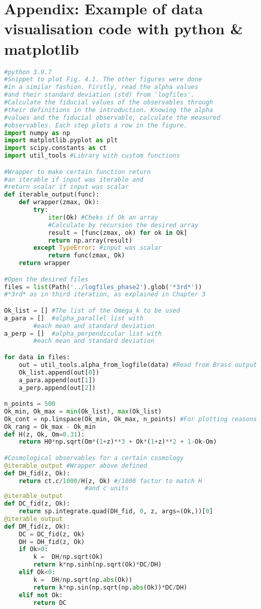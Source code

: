 \chapter*{Appendix: Example of data visualisation code with python \& matplotlib}

\renewcommand{\baselinestretch}{1}
\begin{lstlisting}[language=python]
#python 3.9.7
#Snippet to plot Fig. 4.1. The other figures were done
#in a similar fashion. Firstly, read the alpha values
#and their standard deviation (std) from 'logfiles'.
#Calculate the fiducial values of the observables through
#their definitions in the introduction. Knowing the alpha
#values and the fiducial observable, calculate the measured
#observables. Each step plots a row in the figure.
import numpy as np
import matplotlib.pyplot as plt
import scipy.constants as ct
import util_tools #Library with custom functions

#Wrapper to make certain function return 
#an iterable if input was iterable and 
#return scalar if input was scalar
def iterable_output(func):
    def wrapper(zmax, Ok):
        try:
            iter(Ok) #Cheks if Ok an array
			#Calculate by recursion the desired array
			result = [func(zmax, ok) for ok in Ok] 
            return np.array(result)
        except TypeError: #input was scalar
            return func(zmax, Ok)
    return wrapper

#Open the desired files
files = list(Path('../logfiles_phase2').glob('*3rd*')) 
#*3rd* as in third iteration, as explained in Chapter 3

Ok_list = [] #The list of the Omega_k to be used
a_para = []  #alpha_parallel list with 
		#each mean and standard deviation
a_perp = []  #alpha_perpendicular list with 
		#each mean and standard deviation

for data in files:
    out = util_tools.alpha_from_logfile(data) #Read from Brass output
    Ok_list.append(out[0])
    a_para.append(out[1])
    a_perp.append(out[2])

n_points = 500
Ok_min, Ok_max = min(Ok_list), max(Ok_list)
Ok_cont = np.linspace(Ok_min, Ok_max, n_points) #For plotting reasons
Ok_rang = Ok_max - Ok_min
def H(z, Ok, Om=0.31):
    return H0*np.sqrt(Om*(1+z)**3 + Ok*(1+z)**2 + 1-Ok-Om)

#Cosmological observables for a certain cosmology
@iterable_output #Wrapper above defined
def DH_fid(z, Ok):
    return ct.c/1000/H(z, Ok) #/1000 factor to match H
    			      #and c units
@iterable_output
def DC_fid(z, Ok):
    return sp.integrate.quad(DH_fid, 0, z, args=(Ok,))[0]
@iterable_output
def DM_fid(z, Ok):
    DC = DC_fid(z, Ok)
    DH = DH_fid(z, Ok)
    if Ok>0:
        k =  DH/np.sqrt(Ok)
        return k*np.sinh(np.sqrt(Ok)*DC/DH)
    elif Ok<0:
        k =  DH/np.sqrt(np.abs(Ok))
        return k*np.sin(np.sqrt(np.abs(Ok))*DC/DH)
    elif not Ok:
        return DC


\end{lstlisting}
